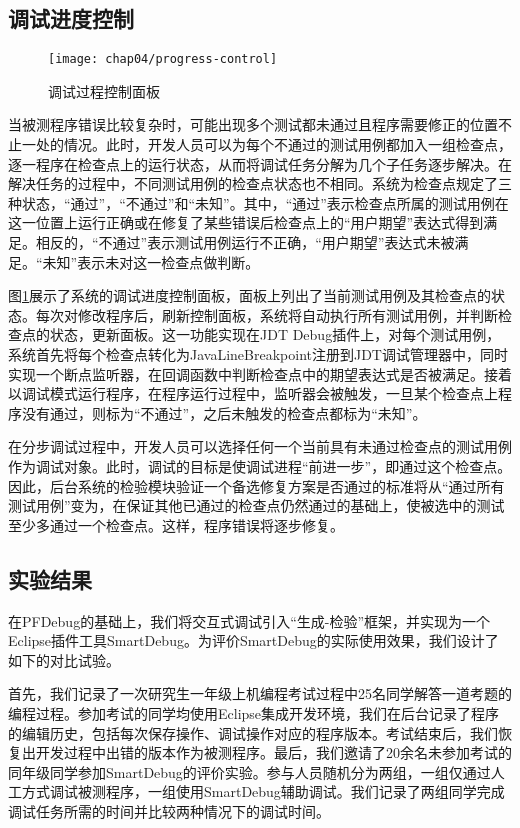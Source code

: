 \subsection{调试进度控制}%


\begin{figure}[!b]
	\centering
	\texttt{[image: chap04/progress-control]}
	\caption{调试过程控制面板}
	\label{fig:progress-control}
\end{figure}

当被测程序错误比较复杂时，可能出现多个测试都未通过且程序需要修正的位置不止一处的情况。此时，开发人员可以为每个不通过的测试用例都加入一组检查点，逐一程序在检查点上的运行状态，从而将调试任务分解为几个子任务逐步解决。在解决任务的过程中，不同测试用例的检查点状态也不相同。系统为检查点规定了三种状态，“通过”，“不通过”和“未知”。其中，“通过”表示检查点所属的测试用例在这一位置上运行正确或在修复了某些错误后检查点上的“用户期望”表达式得到满足。相反的，“不通过”表示测试用例运行不正确，“用户期望”表达式未被满足。“未知”表示未对这一检查点做判断。

图\ref{fig:progress-control}展示了系统的调试进度控制面板，面板上列出了当前测试用例及其检查点的状态。每次对修改程序后，刷新控制面板，系统将自动执行所有测试用例，并判断检查点的状态，更新面板。这一功能实现在JDT Debug插件上，对每个测试用例，系统首先将每个检查点转化为JavaLineBreakpoint注册到JDT调试管理器中，同时实现一个断点监听器，在回调函数中判断检查点中的期望表达式是否被满足。接着以调试模式运行程序，在程序运行过程中，监听器会被触发，一旦某个检查点上程序没有通过，则标为“不通过”，之后未触发的检查点都标为“未知”。

在分步调试过程中，开发人员可以选择任何一个当前具有未通过检查点的测试用例作为调试对象。此时，调试的目标是使调试进程“前进一步”，即通过这个检查点。因此，后台系统的检验模块验证一个备选修复方案是否通过的标准将从“通过所有测试用例”变为，在保证其他已通过的检查点仍然通过的基础上，使被选中的测试至少多通过一个检查点。这样，程序错误将逐步修复。


\subsection{实验结果}%
在PFDebug的基础上，我们将交互式调试引入“生成-检验”框架，并实现为一个Eclipse插件工具SmartDebug。为评价SmartDebug的实际使用效果，我们设计了如下的对比试验。

首先，我们记录了一次研究生一年级上机编程考试过程中25名同学解答一道考题的编程过程。参加考试的同学均使用Eclipse集成开发环境，我们在后台记录了程序的编辑历史，包括每次保存操作、调试操作对应的程序版本。考试结束后，我们恢复出开发过程中出错的版本作为被测程序。最后，我们邀请了20余名未参加考试的同年级同学参加SmartDebug的评价实验。参与人员随机分为两组，一组仅通过人工方式调试被测程序，一组使用SmartDebug辅助调试。我们记录了两组同学完成调试任务所需的时间并比较两种情况下的调试时间。

